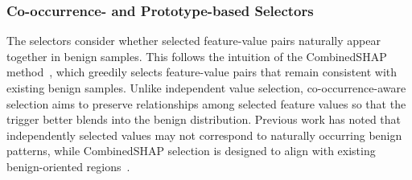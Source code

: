 \subsubsection{Co-occurrence- and Prototype-based Selectors}
The selectors consider whether selected feature-value pairs naturally appear together in benign samples.
This follows the intuition of the CombinedSHAP method~\cite{severi}, which greedily selects feature-value pairs that remain consistent with existing benign samples.
Unlike independent value selection, co-occurrence-aware selection aims to preserve relationships among selected feature values so that the trigger better blends into the benign distribution.
Previous work has noted that independently selected values may not correspond to naturally occurring benign patterns, while CombinedSHAP selection is designed to align with existing benign-oriented regions~\cite{severi,ho_sanitization}.


